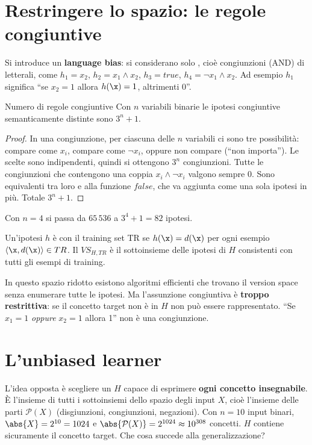 \section{Restringere lo spazio: le regole congiuntive}

Si introduce un \textbf{language bias}: si considerano solo , cioè congiunzioni
(AND) di letterali, come $h_1 = x_2$, $h_2 = x_1\wedge x_2$, $h_3 = \mathit{true}$, $h_4 = \neg x_1\wedge x_2$.
Ad esempio $h_1$ significa ``se $x_2=1$ allora $h(\x)=1$, altrimenti $0$''.

\begin{proprieta}{Numero di regole congiuntive}
Con $n$ variabili binarie le ipotesi congiuntive semanticamente distinte sono $3^n + 1$.
\end{proprieta}
\begin{proof}
In una congiunzione, per ciascuna delle $n$ variabili ci sono tre possibilità: compare come $x_i$, compare come
$\neg x_i$, oppure non compare (``non importa''). Le scelte sono indipendenti, quindi si ottengono $3^n$
congiunzioni. Tutte le congiunzioni che contengono una coppia $x_i\wedge\neg x_i$ valgono sempre 0. Sono
equivalenti tra loro e alla funzione $\mathit{false}$, che va aggiunta come una sola ipotesi in più. Totale
$3^n+1$.
\end{proof}

Con $n=4$ si passa da $65\,536$ a $3^4+1 = 82$ ipotesi.

\begin{definizione}
Un'ipotesi $h$ è  con il training set TR se $h(\x) = d(\x)$ per ogni esempio
$\langle\x, d(\x)\rangle\in TR$. Il  $VS_{H,TR}$ è il sottoinsieme delle ipotesi di $H$
consistenti con tutti gli esempi di training.
\end{definizione}

In questo spazio ridotto esistono algoritmi efficienti che trovano il version space senza enumerare tutte le
ipotesi. Ma l'assunzione congiuntiva è \textbf{troppo restrittiva}: se il concetto target non è in $H$ non può
essere rappresentato. ``Se $x_1=1$ \emph{oppure} $x_2=1$ allora 1'' non è una congiunzione.

\section{L'unbiased learner}

L'idea opposta è scegliere un $H$ capace di esprimere \textbf{ogni concetto insegnabile}. È l'insieme di tutti i
sottoinsiemi dello spazio degli input $X$, cioè l'insieme delle parti $\mathcal{P}(X)$ (disgiunzioni,
congiunzioni, negazioni). Con $n=10$ input binari, $\abs{X} = 2^{10} = 1024$ e
$\abs{\mathcal{P}(X)} = 2^{1024}\approx 10^{308}$ concetti. $H$ contiene sicuramente il concetto target. Che
cosa succede alla generalizzazione?

